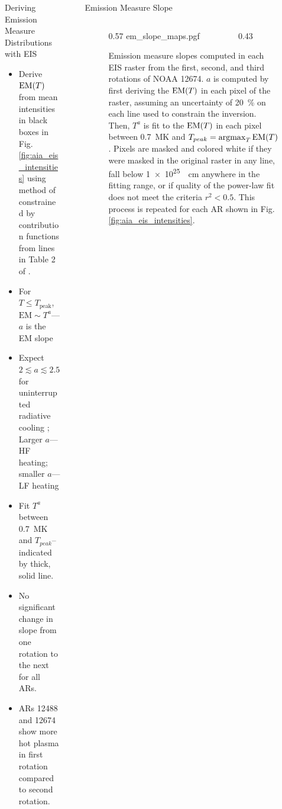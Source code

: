 \documentclass[final]{beamer}
\newcommand{\emd}{\textup{EM}(T)}
\DeclareMathOperator*{\argmax}{argmax}
\newlength{\sepwidth}
\newlength{\colwidth}
\newcommand{\separatorcolumn}{\begin{column}{\sepwidth}\end{column}}
\begin{document}
\begin{frame}[t]
\begin{columns}[t]
\begin{column}{\colwidth}
\begin{block}{Deriving Emission Measure Distributions with EIS}
    \begin{itemize}
      \item Derive $\emd$ from mean intensities in black boxes in Fig. \autoref{fig:aia_eis_intensities} using method of \citet{hannah_differential_2012} constrained by contribution functions from lines in Table 2 of \citet{warren_systematic_2012}.
      \item For $T\le T_\mathrm{peak}$, $\mathrm{EM}\sim T^a$---$a$ is the \alert{EM slope} \citep{jordan_structure_1975}
      \item Expect $2\lesssim a\lesssim2.5$ for uninterrupted radiative cooling \citep{cargill_implications_1994}; \alert{Larger $a$---HF heating; smaller $a$---LF heating}
      \item Fit $T^a$ between \SI{0.7}{\mega\kelvin} and $T_{peak}$--indicated by thick, solid line.
      \item \alert{No significant change in slope from one rotation to the next for all ARs.}
      \item \alert{ARs 12488 and 12674 show more hot plasma} in \textcolor{C0}{first} rotation compared to \textcolor{C1}{second} rotation.
    \end{itemize}

  \end{block}

\end{column}

\separatorcolumn

\begin{column}{\colwidth}

  \begin{block}{Emission Measure Slope}

    \begin{figure}
      \centering
      \begin{columns}[c]
        \begin{column}{0.57\colwidth}
          {em_slope_maps.pgf}
        \end{column}
        \begin{column}{0.43\colwidth}
          \caption{Emission measure slopes computed in each EIS raster from the \textcolor{C0}{first}, \textcolor{C1}{second}, and \textcolor{C2}{third} rotations of NOAA 12674. $a$ is computed by first deriving the $\emd$ in each pixel of the raster, assuming an uncertainty of \SI{20}{\percent} on each line used to constrain the inversion. Then, $T^a$ is fit to the $\emd$ in each pixel between \SI{0.7}{\mega\kelvin} and $T_{peak}=\argmax_T{\emd}$. Pixels are masked and colored white if they were masked in the original raster in any line, fall below \SI{1e25}{\centi\meter} anywhere in the fitting range, or if quality of the power-law fit does not meet the criteria $r^2<0.5$. This process is repeated for each AR shown in Fig. \autoref{fig:aia_eis_intensities}.}
          \label{fig:em_slope_maps}
        \end{column}
      \end{columns}
    \end{figure}


\end{block}
\end{column}
\end{columns}
\end{frame}
\end{document}
